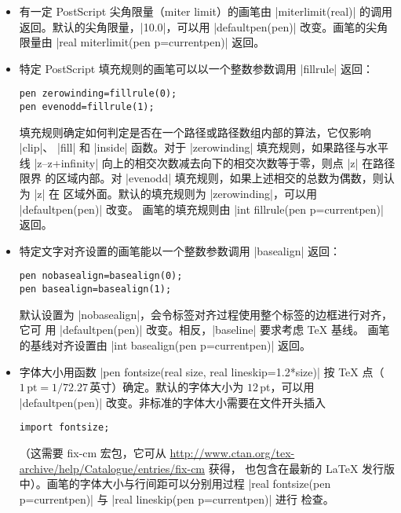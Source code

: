 \documentclass[nofonts,CJKnormalspaces]{ctexbook}[2009/05/20]
\newcommand*\prgname[1]{\textsf{#1}}
\begin{document}
\begin{itemize}
\item 有一定 \prgname{PostScript} 尖角限量（miter limit）的画笔由
  |miterlimit(real)| 的调用返回。默认的尖角限量，|10.0|，可以用
  |defaultpen(pen)| 改变。画笔的尖角限量由 |real miterlimit(pen p=currentpen)|
  返回。

\item 特定 \prgname{PostScript} 填充规则的画笔可以以一个整数参数调用
  |fillrule| 返回：
\begin{lstlisting}
pen zerowinding=fillrule(0);
pen evenodd=fillrule(1);
\end{lstlisting}
  填充规则确定如何判定是否在一个路径或路径数组内部的算法，它仅影响 |clip|、
  |fill| 和 |inside| 函数。对于 |zerowinding| 填充规则，如果路径与水平线
  |z--z+infinity| 向上的相交次数减去向下的相交次数等于零，则点 |z| 在路径限界
  的区域内部。对 |evenodd| 填充规则，如果上述相交的总数为偶数，则认为 |z| 在
  区域外面。默认的填充规则为 |zerowinding|，可以用 |defaultpen(pen)| 改变。
  画笔的填充规则由 |int fillrule(pen p=currentpen)| 返回。

\item 特定文字对齐设置的画笔能以一个整数参数调用 |basealign| 返回：
\begin{lstlisting}
pen nobasealign=basealign(0);
pen basealign=basealign(1);
\end{lstlisting}
  默认设置为 |nobasealign|，会令标签对齐过程使用整个标签的边框进行对齐，它可
  用 |defaultpen(pen)| 改变。相反，|baseline| 要求考虑 \TeX{} 基线。
  画笔的基线对齐设置由 |int basealign(pen p=currentpen)| 返回。

\item 字体大小用函数 |pen fontsize(real size, real lineskip=1.2*size)| 按
  \TeX{} 点（$1\,\text{pt}=1/72.27 \,\text{英寸}$）确定。默认的字体大小为
  $12$\,pt，可以用 |defaultpen(pen)| 改变。非标准的字体大小需要在文件开头插入
\index{fontsize.asy@\prgname{fontsize.asy}}
\begin{lstlisting}
import fontsize;
\end{lstlisting}
  （这需要 \prgname{fix-cm} 宏包，它可从
  \url{http://www.ctan.org/tex-archive/help/Catalogue/entries/fix-cm} 获得，
  也包含在最新的 \LaTeX{} 发行版中）。画笔的字体大小与行间距可以分别用过程
  |real fontsize(pen p=currentpen)| 与 |real lineskip(pen p=currentpen)| 进行
  检查。


\end{itemize}
\end{document}
